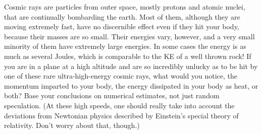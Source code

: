 Cosmic rays are particles from outer space, mostly
protons and atomic nuclei, that are continually bombarding
the earth. Most of them, although they are moving extremely
fast, have no discernible effect even if they hit your body,
because their masses are so small. Their energies vary,
however, and a very small minority of them have extremely
large energies. In some cases the energy is as much as
several Joules, which is comparable to the KE of a well
thrown rock! If you are in a plane at a high altitude and
are so incredibly unlucky as to be hit by one of these rare
ultra-high-energy cosmic rays, what would you notice, the
momentum imparted to your body, the energy dissipated in
your body as heat, or both? Base your conclusions on
numerical estimates, not just random speculation. (At these
high speeds, one should really take into account the
deviations from Newtonian physics described by Einstein's
special theory of relativity. Don't worry about that, though.)
